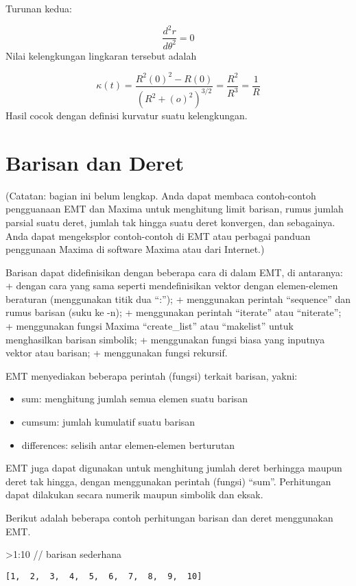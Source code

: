 \documentclass[
]{book}
\begin{document}
Turunan kedua:

\[\frac{d^2r}{d\theta^2}=0\]Nilai kelengkungan lingkaran tersebut adalah

\[\kappa(t)=\frac{R^2(0)^2-R(0)}{\left(R^2+(o)^2\right)^{3/2}}=\frac{R^2}{R^3}=\frac{1}{R}\]Hasil cocok dengan definisi kurvatur suatu kelengkungan.

\chapter{Barisan dan Deret}\label{barisan-dan-deret}

(Catatan: bagian ini belum lengkap. Anda dapat membaca contoh-contoh pengguanaan EMT dan Maxima untuk menghitung limit barisan, rumus jumlah parsial suatu deret, jumlah tak hingga suatu deret konvergen, dan sebagainya. Anda dapat mengeksplor contoh-contoh di EMT atau perbagai panduan penggunaan Maxima di software Maxima atau dari Internet.)

Barisan dapat didefinisikan dengan beberapa cara di dalam EMT, di antaranya: + dengan cara yang sama seperti mendefinisikan vektor dengan elemen-elemen beraturan (menggunakan titik dua ``:''); + menggunakan perintah ``sequence'' dan rumus barisan (suku ke -n); + menggunakan perintah ``iterate'' atau ``niterate''; + menggunakan fungsi Maxima ``create\_list'' atau ``makelist'' untuk menghasilkan barisan simbolik; + menggunakan fungsi biasa yang inputnya vektor atau barisan; + menggunakan fungsi rekursif.

EMT menyediakan beberapa perintah (fungsi) terkait barisan, yakni:

\begin{itemize}
\item
  sum: menghitung jumlah semua elemen suatu barisan
\item
  cumsum: jumlah kumulatif suatu barisan
\item
  differences: selisih antar elemen-elemen berturutan
\end{itemize}

EMT juga dapat digunakan untuk menghitung jumlah deret berhingga maupun deret tak hingga, dengan menggunakan perintah (fungsi) ``sum''. Perhitungan dapat dilakukan secara numerik maupun simbolik dan eksak.

Berikut adalah beberapa contoh perhitungan barisan dan deret menggunakan EMT.

\textgreater1:10 // barisan sederhana

\begin{verbatim}
[1,  2,  3,  4,  5,  6,  7,  8,  9,  10]
\end{verbatim}
\end{document}
